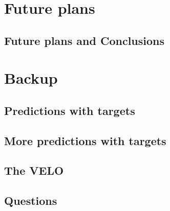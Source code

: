\documentclass[aspectratio=169, 10pt]{beamer}
\begin{document}
\section{Future plans}

\subsection{Future plans and Conclusions}



\backupbegin
\section{Backup}

\subsection{Predictions with targets}


\subsection{More predictions with targets}


\subsection{The VELO}


\subsection{Questions}


\backupend
\end{document}
